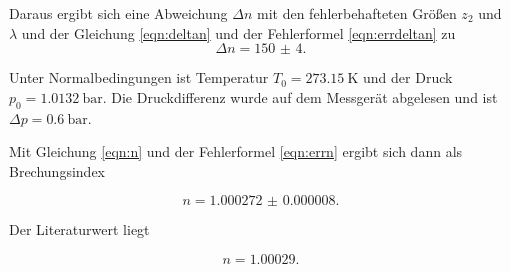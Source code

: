 \noindent Daraus ergibt sich eine Abweichung $\Delta n$ mit den fehlerbehafteten Größen $z_2$ und $\lambda$ und der Gleichung \eqref{eqn:deltan} und der Fehlerformel \eqref{eqn:errdeltan} zu 
\begin{equation*}
    \Delta n = \num{150(4)}.
\end{equation*}

\noindent Unter Normalbedingungen ist Temperatur $T_0 = \SI{273.15}{\kelvin}$ und der Druck $ p_0 = \SI{1.0132}{\bar}.$ Die Druckdifferenz wurde auf dem Messgerät abgelesen und ist $\Delta p= \SI{0.6}{\bar}$.

\noindent Mit Gleichung \eqref{eqn:n} und der Fehlerformel \eqref{eqn:errn} ergibt sich dann als Brechungsindex

\begin{equation*}
    n = \num{1.000272(8)}.
\end{equation*}

Der Literaturwert liegt \cite{luft}

\begin{equation*}
    n = \num{1.00029}.
\end{equation*}


